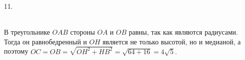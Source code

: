 11. \begin{figure}[ht!]
\end{figure}\\
В треугольнике $OAB$ стороны $OA$ и $OB$ равны, так как являются радиусами. Тогда он равнобедренный и $OH$ является не только высотой, но и медианой, а поэтому $OC=OB=\sqrt{OH^2+HB^2}=\sqrt{64+16}=4\sqrt{5}.$\newpage\noindent
